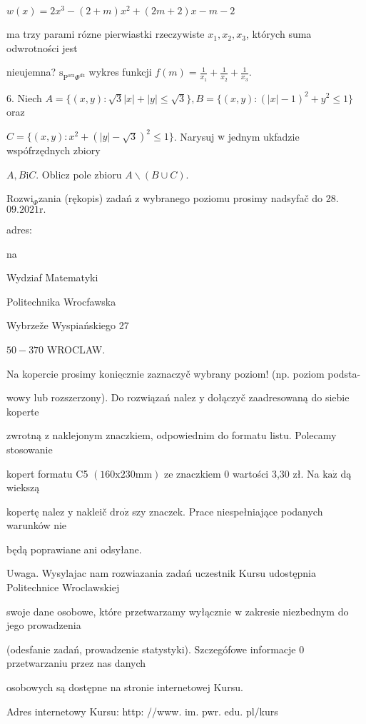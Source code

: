 \documentclass[a4paper,12pt]{article}
\begin{document}
$w(x)=2x^{3}-(2+m)x^{2}+(2m+2)x-m-2$

ma trzy parami rózne pierwiastki rzeczywiste $x_{1}, x_{2}, x_{3}$, których suma odwrotności jest

nieujemna? $\mathrm{s}_{\mathrm{P}^{\mathrm{o}\mathrm{r}\mathrm{z}}\Phi^{\mathrm{d}\acute{\mathrm{z}}}}$ wykres funkcji $f(m)=\displaystyle \frac{1}{x_{1}}+\frac{1}{x_{2}}+\frac{1}{x_{3}}.$

6. Niech $A = \{(x,y):\sqrt{3}|x|+|y|\leq\sqrt{3}\}, B = \{(x,y):(|x|-1)^{2}+y^{2}\leq 1\}$ oraz

$C=\{(x,y):x^{2}+(|y|-\sqrt{3})^{2}\leq 1\}$. Narysuj $\mathrm{w}$ jednym ukfadzie wspófrzędnych zbiory

$A, B\mathrm{i}C$. Oblicz pole zbioru $A\backslash (B\cup C).$

$\mathrm{R}\mathrm{o}\mathrm{z}\mathrm{w}\mathrm{i}_{\Phi}$zania (rękopis) zadań $\mathrm{z}$ wybranego poziomu prosimy nadsyfač do 28.$09.2021\mathrm{r}.$

adres:

na

Wydziaf Matematyki

Politechnika Wrocfawska

Wybrzeže Wyspiańskiego 27

$50-370$ WROCLAW.

Na kopercie prosimy $\underline{\mathrm{k}\mathrm{o}\mathrm{n}\mathrm{i}\mathrm{e}\mathrm{c}\mathrm{z}\mathrm{n}\mathrm{i}\mathrm{e}}$ zaznaczyč wybrany poziom! (np. poziom podsta-

wowy lub rozszerzony). Do rozwiązań nalez $\mathrm{y}$ dołączyč zaadresowaną do siebie koperte

zwrotną $\mathrm{z}$ naklejonym znaczkiem, odpowiednim do formatu listu. Polecamy stosowanie

kopert formatu C5 $(160\mathrm{x}230\mathrm{m}\mathrm{m})$ ze znaczkiem $0$ wartości 3,30 zł. Na $\mathrm{k}\mathrm{a}\dot{\mathrm{z}}$ dą wiekszą

kopertę nalez $\mathrm{y}$ nakleič $\mathrm{d}\mathrm{r}\mathrm{o}\dot{\mathrm{z}}$ szy znaczek. Prace niespełniające podanych warunków nie

będą poprawiane ani odsyłane.

Uwaga. Wysylajac nam rozwiazania zadań uczestnik Kursu udostępnia Politechnice Wroclawskiej

swoje dane osobowe, które przetwarzamy wyłącznie $\mathrm{w}$ zakresie niezbednym do jego prowadzenia

(odesfanie zadań, prowadzenie statystyki). Szczegófowe informacje $0$ przetwarzaniu przez nas danych

osobowych są dostępne na stronie internetowej Kursu.

Adres internetowy Kursu: http: //www. im. pwr. edu. pl/kurs
\end{document}

